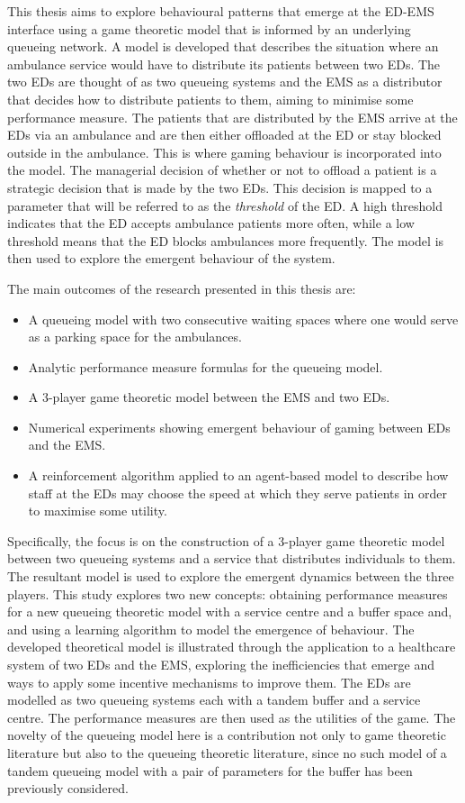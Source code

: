 This thesis aims to explore behavioural patterns that emerge at the ED-EMS
interface using a game theoretic model that is informed by an underlying
queueing network.
A model is developed that describes the situation where an ambulance service
would have to distribute its patients between two EDs.
The two EDs are thought of as two queueing systems and the EMS as a distributor
that decides how to distribute patients to them, aiming to minimise some
performance measure.
The patients that are distributed by the EMS arrive at the EDs via an ambulance
and are then either offloaded at the ED or stay blocked outside in the
ambulance.
This is where gaming behaviour is incorporated into the model.
The managerial decision of whether or not to offload a patient is a strategic
decision that is made by the two EDs.
This decision is mapped to a parameter that will be referred to as the
\textit{threshold} of the ED.
A high threshold indicates that the ED accepts ambulance patients more often,
while a low threshold means that the ED blocks ambulances more frequently.
The model is then used to explore the emergent behaviour of the system.

The main outcomes of the research presented in this thesis are:
\begin{itemize}
    \item A queueing model with two consecutive waiting spaces where one would
    serve as a parking space for the ambulances.
    \item Analytic performance measure formulas for the queueing model.
    \item A 3-player game theoretic model between the EMS and two EDs.
    \item Numerical experiments showing emergent behaviour of gaming between
    EDs and the EMS.
    \item A reinforcement algorithm applied to an agent-based model to describe
    how staff at the EDs may choose the speed at which they serve patients in
    order to maximise some utility.
\end{itemize}

Specifically, the focus is on the construction of a 3-player game theoretic
model between two queueing systems and a service that distributes individuals
to them.
The resultant model is used to explore the emergent dynamics between the three
players.
This study explores two new concepts: obtaining performance measures for a new
queueing theoretic model with a service centre and a buffer space and, and
using a learning algorithm to model the emergence of behaviour.
The developed theoretical model is illustrated through the application to
a healthcare system of two EDs and the EMS, exploring the inefficiencies that
emerge and ways to apply some incentive mechanisms to improve them.
The EDs are modelled as two queueing systems each with a tandem buffer and a
service centre.
The performance measures are then used as the utilities of the game.
The novelty of the queueing model here is a contribution not only to game
theoretic literature but also to the queueing theoretic literature, since
no such model of a tandem queueing model with a pair of parameters for the
buffer has been previously considered.

